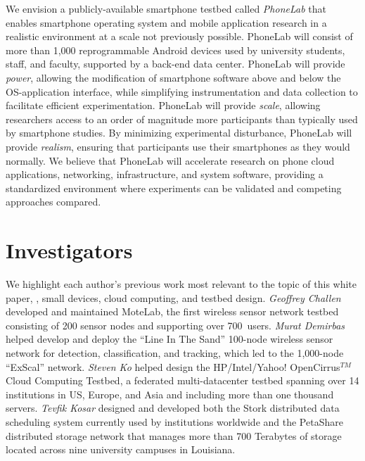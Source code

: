 We envision a publicly-available smartphone testbed called \emph{PhoneLab}
that enables smartphone operating system and mobile application research in a
realistic environment at a scale not previously possible. PhoneLab will
consist of more than 1,000 reprogrammable Android devices
used by university students, staff, and faculty, supported by a back-end
data center. PhoneLab will provide \emph{power}, allowing the modification of
smartphone software above and below the OS-application interface, while
simplifying instrumentation and data collection to facilitate efficient
experimentation. PhoneLab will provide \emph{scale}, allowing researchers
access to an order of magnitude more participants than typically used by
smartphone studies. By minimizing experimental disturbance, PhoneLab will
provide \emph{realism}, ensuring that participants use their smartphones as
they would normally. We believe that PhoneLab will accelerate research on
phone cloud applications, networking, infrastructure, and system software,
providing a standardized environment where experiments can be validated and
competing approaches compared.


\section{Investigators}
We highlight each author's previous work most relevant to the topic of this
white paper, \ie, small devices, cloud computing, and testbed design.
\emph{Geoffrey Challen} developed and
maintained MoteLab, the first wireless
sensor network testbed consisting of 200 sensor nodes and supporting over
700~users. \emph{Murat Demirbas} helped develop and deploy the ``Line In
The Sand'' 100-node wireless sensor network for
detection, classification, and tracking, which led to the 1,000-node
``ExScal'' network. \emph{Steven Ko} helped design the
HP/Intel/Yahoo! OpenCirrus$^{TM}$ Cloud
Computing Testbed, a federated multi-datacenter testbed spanning over
14 institutions in US, Europe, and Asia and including more than one
thousand servers. \emph{Tevfik Kosar} designed and developed both the
Stork distributed data scheduling system currently used by institutions
worldwide and the PetaShare distributed storage network that manages more
than 700 Terabytes of storage located across nine university campuses in
Louisiana.

